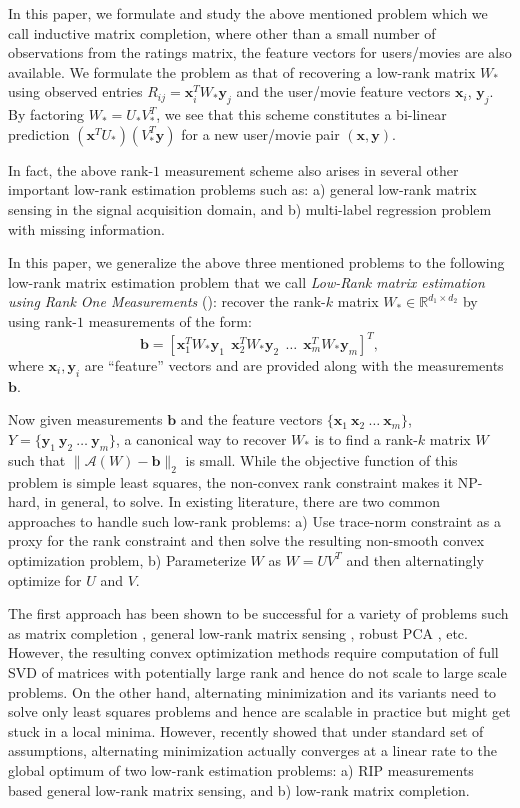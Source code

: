 \documentclass[11pt]{article}
\newcommand{\tp}[1]{{#1}^{T}}
\newcommand{\Vot}{\tp{V}_*}
\newcommand{\Uo}{U_*}
\newcommand{\Wo}{W_*}
\newcommand{\x}{\bm{x}}
\newcommand{\y}{\bm{y}}
\renewcommand{\b}{\bm{b}}
\begin{document}
In this paper, we formulate and study the above mentioned problem which we call inductive matrix  completion, where other than a small number of observations from the ratings matrix, the feature vectors for users/movies are also available. We formulate the problem as that of recovering a low-rank  matrix $\Wo$ using observed entries $R_{ij}=\x_i^T \Wo \y_j$ and the user/movie feature vectors $\x_i$, $\y_j$. By factoring $\Wo=\Uo\Vot$, we see that this scheme constitutes a bi-linear prediction $(\x^T\Uo)(\Vot\y)$ for a new user/movie pair $(\x,\y)$. 

In fact, the above rank-$1$ measurement scheme also arises in several other important low-rank estimation problems such as: a) general low-rank matrix sensing in the signal acquisition domain, and b) multi-label regression problem with missing information. 

In this paper, we generalize the above three mentioned problems to the following low-rank matrix estimation problem that we call {\em Low-Rank matrix estimation using Rank One Measurements} ({\bf \lrrom}): recover the rank-$k$ matrix $\Wo \in \mathbb{R}^{d_1\times d_2}$ by using rank-$1$ measurements of the form: $$\b=[\x_1^T\Wo \y_1\ \ \x_2^T \Wo \y_2\ \ \dots\ \ \x_m^T \Wo\y_m]^T,$$
where $\x_i, \y_i$ are ``feature'' vectors and are provided along with the measurements $\b$.  

Now given measurements $\b$ and the feature vectors $\{\x_1\ \x_2\ \dots\ \x_m\}$, $Y=\{\y_1\ \y_2\ \dots\ \y_m\}$, a canonical way to recover $\Wo$ is to find a rank-$k$ matrix $W$ such that $\|\mathcal{A}(W)-\b\|_2$ is small. While the objective function of this problem is  simple least squares, the non-convex rank constraint makes it NP-hard, in general, to solve. In existing literature, there are two common approaches to handle such low-rank problems: a) Use trace-norm constraint as a proxy for the rank constraint and then solve the resulting non-smooth convex optimization problem, b) Parameterize $W$ as $W=UV^T$ and then alternatingly optimize for $U$ and $V$. 

The first approach has been shown to be successful for a variety of problems such as matrix completion \cite{CandesR2007, CandesT2009, Gross2009, KeshavanOM2009}, general low-rank matrix sensing \cite{RechtFP2007}, robust PCA \cite{CandesLMW11,ChandrasekaranSPW2009}, etc. However, the resulting convex optimization methods require computation of full SVD of matrices with potentially large rank  and hence do not scale to large scale problems. On the other hand, alternating minimization and its variants need to solve only least squares problems and hence are scalable in practice but might get stuck in a local minima. %
 However, \cite{JainNS13} recently showed that under standard set of assumptions, alternating minimization actually converges at a linear rate to the global optimum of two low-rank estimation problems: a) RIP measurements based general low-rank matrix sensing, and b) low-rank matrix completion. 
\end{document}
